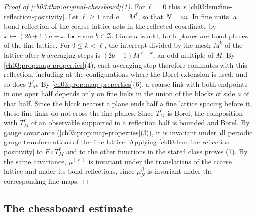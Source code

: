 \begin{proof}[Proof of \cref{ch03:thm:original-chessboard}(1)]
For $\ell=0$ this is \cref{ch03:lem:fine-reflection-positivity}. Let $\ell\ge1$ and $a=M^\ell$, so that $N=an$. In fine units, a bond reflection of the coarse lattice acts in the reflected coordinate by $x\mapsto(2b+1)a-x$ for some $b\in\mathbb Z$. Since $a$ is odd, both planes are bond planes of the fine lattice. For $0\le k<\ell$, the intercept divided by the mesh $M^k$ of the lattice after $k$ averaging steps is $(2b+1)M^{\ell-k}$, an odd multiple of $M$. By \cref{ch03:prop:map-properties}(4), each averaging step therefore commutes with this reflection, including at the configurations where the Borel extension is used, and so does $T_M^\ell$. By \cref{ch03:prop:map-properties}(6), a coarse link with both endpoints in one open half depends only on fine links in the union of the blocks of side $a$ of that half. Since the block nearest a plane ends half a fine lattice spacing before it, these fine links do not cross the fine planes. Since $T_M^\ell$ is Borel, the composition with $T_M^\ell$ of an observable supported in a reflection half is bounded and Borel. By gauge covariance (\cref{ch03:prop:map-properties}(3)), it is invariant under all periodic gauge transformations of the fine lattice. Applying \cref{ch03:lem:fine-reflection-positivity} to $F\circ T_M^\ell$ and to the other functions in the stated class proves (1). By the same covariance, $\mu^{(\ell)}$ is invariant under the translations of the coarse lattice and under its bond reflections, since $\mu_N^\beta$ is invariant under the corresponding fine maps.
\end{proof}

\subsection{The chessboard estimate}\label{ch03:sec:chessboard-proof}

